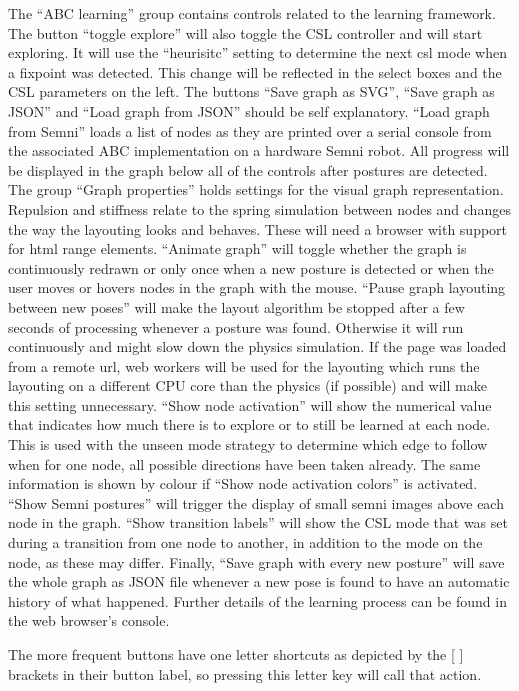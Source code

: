 \documentclass[10pt,a4paper]{article}
\begin{document}
The ``ABC learning'' group contains controls related to the learning framework. The button ``toggle
explore'' will also toggle the CSL controller and will start exploring. It will use the ``heurisitc''
setting to determine the next csl mode when a fixpoint was detected. This
change will be reflected in the select boxes and the CSL parameters on the left.  The buttons ``Save
graph as SVG'', ``Save graph as JSON'' and ``Load graph from JSON'' should be self explanatory.
``Load graph from Semni'' loads a list of nodes as they are printed over a serial console from the
associated ABC implementation on a hardware Semni robot.  All progress will be displayed in the
graph below all of the controls after postures are detected. The group ``Graph properties'' holds
settings for the visual graph representation. Repulsion and stiffness relate to the spring
simulation between nodes and changes the way the layouting looks and behaves. These will need a
browser with support for html range elements. ``Animate graph'' will toggle whether the graph is
continuously redrawn or only once when a new posture is detected or when the user moves or hovers
nodes in the graph with the mouse.  ``Pause graph layouting between new poses'' will make the layout
algorithm be stopped after a few seconds of processing whenever a posture was found. Otherwise it
will run continuously and might slow down the physics simulation. If the page was loaded from a
remote url, web workers will be used for the layouting which runs the layouting on a different CPU
core than the physics (if possible) and will make this setting unnecessary. ``Show node activation''
will show the numerical value that indicates how much there is to explore or to still be learned at
each node. This is used with the unseen mode strategy to determine which edge to follow when for one
node, all possible directions have been taken already. The same information is shown by colour if
``Show node activation colors'' is activated. ``Show Semni postures'' will trigger the display of
small semni images above each node in the graph. ``Show transition labels'' will show the CSL mode
that was set during a transition from one node to another, in addition to the mode on the node, as
these may differ. Finally, ``Save graph with every new posture'' will save the whole graph as JSON
file whenever a new pose is found to have an automatic history of what happened.  Further details of
the learning process can be found in the web browser's console.

The more frequent buttons have one letter shortcuts as depicted by the [ ] brackets in their button
label, so pressing this letter key will call that action.
\end{document}
